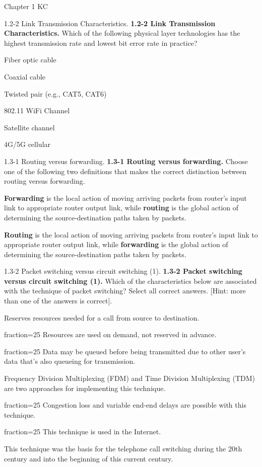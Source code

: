 \documentclass[a4paper]{article}
\begin{document}
\begin{quiz}{Chapter 1 KC}
\begin{multi}[points=1,shuffle=true]{1.2-2 Link Transmission Characteristics.}
\textbf{1.2-2 Link Transmission Characteristics.}
Which of the following physical layer technologies has the highest transmission rate and lowest bit error rate in practice?
\item* Fiber optic cable
\item Coaxial cable
\item Twisted pair (e.g., CAT5, CAT6)
\item 802.11 WiFi Channel
\item Satellite channel
\item 4G/5G cellular
\end{multi}

\begin{multi}[points=1,shuffle=true]{1.3-1 Routing versus forwarding.}
\textbf{1.3-1 Routing versus forwarding.} 
Choose one of the following two definitions that makes the correct distinction between routing versus forwarding.
\item* \textbf{Forwarding} is the local action of moving arriving packets from router's input link to appropriate router output link, while \textbf{routing} is the global action of determining the source-destination paths taken by packets.
\item \textbf{Routing} is the local action of moving arriving packets from router's input link to appropriate router output link, while \textbf{forwarding} is the global action of determining the source-destination paths taken by packets.
\end{multi}

\begin{multi}[points=1,shuffle=true,multiple]{1.3-2 Packet switching versus circuit switching (1).}
\textbf{1.3-2 Packet switching versus circuit switching (1).} 
Which of the characteristics below are associated with the technique of packet switching? Select all correct answers. [Hint: more than one of the answers is correct].
\item Reserves resources needed for a call from source to destination.
\item[fraction=25] Resources are used on demand, not reserved in advance.
\item[fraction=25] Data may be queued before being transmitted due to other user's data that's also queueing for transmission.
\item Frequency Division Multiplexing (FDM) and Time Division Multiplexing (TDM) are two approaches for implementing this technique.
\item[fraction=25] Congestion loss and variable end-end delays are possible with this technique.
\item[fraction=25] This technique is used in the Internet.
\item This technique was the basis for the telephone call switching during the 20th century and into the beginning of this current century.
\end{multi}


\end{quiz}
\end{document}
